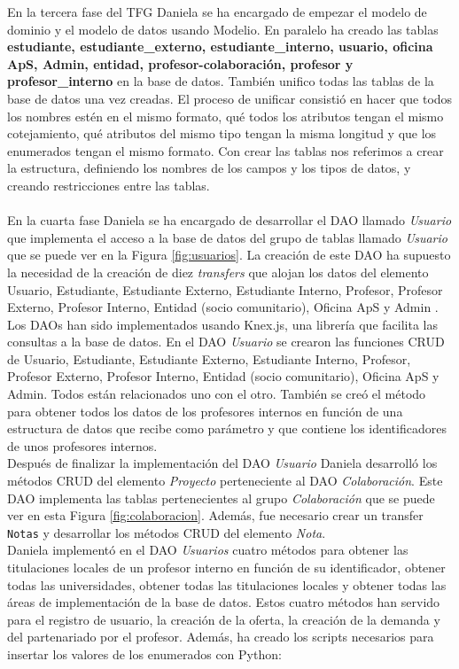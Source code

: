 \documentclass[11pt]{book}
\begin{document}
En la tercera fase del TFG Daniela se ha encargado de empezar el modelo de dominio y el modelo de datos usando Modelio. En paralelo ha creado las tablas \textbf{estudiante, estudiante\_externo, estudiante\_interno, usuario, oficina ApS, Admin, entidad, profesor-colaboración, profesor y profesor\_interno} en la base de datos. También unifico todas las tablas de la base de datos una vez creadas. El proceso de unificar consistió en hacer que todos los nombres estén en el mismo formato, qué todos los atributos tengan el mismo cotejamiento, qué atributos del mismo tipo tengan la misma longitud y que los enumerados tengan el mismo formato. Con crear las tablas nos referimos a crear la estructura, definiendo los nombres de los campos y los tipos de datos, y creando restricciones entre las tablas.\\\\
En la cuarta fase Daniela se ha encargado de desarrollar el DAO llamado \textit{Usuario} que implementa el acceso a la base de datos del grupo de tablas llamado \textit{Usuario} que se puede ver en la Figura \ref{fig:usuarios}. La creación de este DAO ha supuesto la necesidad de la creación de diez \textit{transfers} que alojan los datos del elemento Usuario, Estudiante, Estudiante Externo, Estudiante Interno, Profesor, Profesor Externo, Profesor Interno, Entidad (socio comunitario), Oficina ApS y Admin . Los DAOs han sido implementados usando Knex.js, una librería que facilita las consultas a la base de datos. En el DAO \textit{Usuario} se crearon las funciones CRUD de Usuario, Estudiante, Estudiante Externo, Estudiante Interno, Profesor, Profesor Externo, Profesor Interno, Entidad (socio comunitario), Oficina ApS y Admin. Todos están relacionados uno con el otro. También se creó el método para obtener todos los datos de los profesores internos en función de una estructura de datos que recibe como parámetro y que contiene los identificadores de unos profesores internos.\\
Después de finalizar la implementación del DAO \textit{Usuario} Daniela desarrolló los métodos CRUD del elemento \textit{Proyecto} perteneciente al DAO \textit{Colaboración}. Este DAO implementa las tablas pertenecientes al grupo \textit{Colaboración} que se puede ver en esta Figura \ref{fig:colaboracion}. Además, fue necesario crear un transfer \texttt{Notas} y desarrollar los métodos CRUD del elemento \textit{Nota}.\\
 Daniela implementó en el DAO \textit{Usuarios} cuatro métodos para obtener las titulaciones locales de un profesor interno en función de su identificador, obtener todas las universidades, obtener todas las titulaciones locales y obtener todas las áreas de implementación de la base de datos. Estos cuatro métodos han servido para el registro de usuario, la creación de la oferta, la creación de la demanda y del partenariado por el profesor. Además, ha creado los scripts necesarios para insertar los valores de los enumerados con Python:
\end{document}
